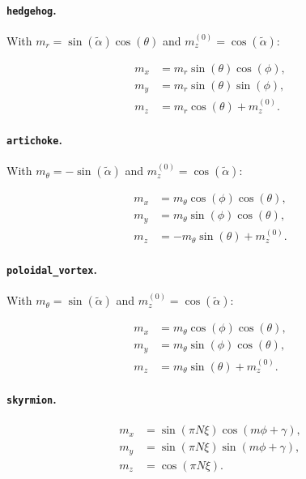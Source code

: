 \documentclass[11pt,a4paper]{article}
\begin{document}
\paragraph{\texttt{hedgehog}.}

With \(m_r = \sin(\tilde{\alpha})\cos(\theta)\) and
\(m_z^{(0)} = \cos(\tilde{\alpha})\):

\begin{align*}
    m_x &= m_r \sin(\theta)\cos(\phi), \\
    m_y &= m_r \sin(\theta)\sin(\phi), \\
    m_z &= m_r \cos(\theta) + m_z^{(0)} .
\end{align*}

\paragraph{\texttt{artichoke}.}

With \(m_\theta = -\sin(\tilde{\alpha})\) and
\(m_z^{(0)} = \cos(\tilde{\alpha})\):

\begin{align*}
    m_x &= m_\theta \cos(\phi)\cos(\theta), \\
    m_y &= m_\theta \sin(\phi)\cos(\theta), \\
    m_z &= -m_\theta \sin(\theta) + m_z^{(0)} .
\end{align*}

\paragraph{\texttt{poloidal\_vortex}.}

With \(m_\theta = \sin(\tilde{\alpha})\) and
\(m_z^{(0)} = \cos(\tilde{\alpha})\):

\begin{align*}
    m_x &= m_\theta \cos(\phi)\cos(\theta), \\
    m_y &= m_\theta \sin(\phi)\cos(\theta), \\
    m_z &= m_\theta \sin(\theta) + m_z^{(0)} .
\end{align*}

\paragraph{\texttt{skyrmion}.}

\begin{align*}
    m_x &= \sin(\pi N \xi)\cos(m\phi + \gamma), \\
    m_y &= \sin(\pi N \xi)\sin(m\phi + \gamma), \\
    m_z &= \cos(\pi N \xi).
\end{align*}
\end{document}
